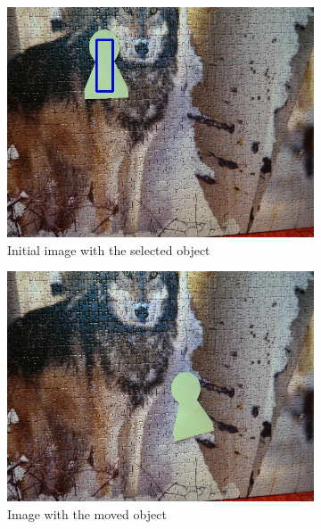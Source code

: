 \begin{figure}
  \centering
  \begin{subfigure}[b]{0.48\linewidth}
    \includegraphics[width=\linewidth]{img/hsv/initial.jpg}
    \caption{Initial image with the selected object}
  \end{subfigure}
  \begin{subfigure}[b]{0.48\linewidth}
    \includegraphics[width=\linewidth]{img/hsv/object.jpg}
    \caption{Image with the moved object}
  \end{subfigure}
  \begin{subfigure}[b]{0.48\linewidth}

\end{subfigure}
\end{figure}
